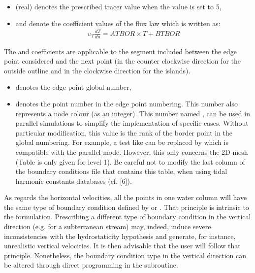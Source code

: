 \begin{itemize}
\item {} (real) denotes the prescribed tracer value when the
 value is set to 5,

\item {} and  denote the coefficient values of the
flux law which is written as:
\begin{align}
\upsilon _{T} \frac{dT}{dn} = ATBOR \times T + BTBOR
\end{align}
\end{itemize}
The  and  coefficients are applicable to the
segment included between the edge point considered and the next point
(in the counter clockwise direction for the outside outline and in the
clockwise direction for the islands).

\begin{itemize}
\item {} denotes the edge point global number,

\item {} denotes the point number in the edge point numbering. This
number also represents a node colour (as an integer). This number named
,
can be used in parallel simulations to simplify the implementation of specific
cases. Without particular modification, this value is the rank of the border
point in the global numbering.
For example, a test like  can be replaced by
 which is compatible with
the parallel mode. However, this only concerns the 2D mesh (Table
 is only given for level 1).
Be careful not to modify the last column of the boundary conditions file
that contains this  table,
when using tidal harmonic constants databases (cf. [6]).
\end{itemize}

As regards the horizontal velocities, all the points in one water column will
have the same type of boundary condition defined by  or
.
That principle is intrinsic to the  formulation. Prescribing a
different type of boundary condition in the vertical direction (e.g. for a
subterranean stream) may, indeed, induce severe inconsistencies with the
hydrostaticity hypothesis and generate, for instance, unrealistic vertical
velocities. It is then advisable that the user will follow that principle.
Nonetheless, the boundary condition type in the vertical direction can be
altered through direct programming in the  subroutine.

